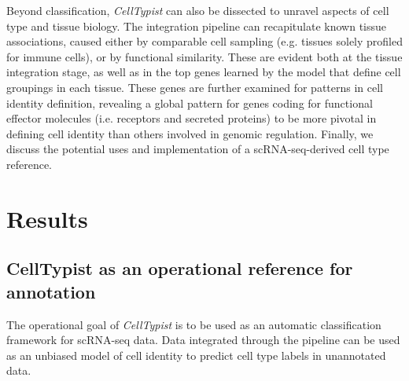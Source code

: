 Beyond classification, \textit{CellTypist} can also be dissected to unravel aspects of cell type and tissue biology. The integration pipeline can recapitulate known tissue associations, caused either by comparable cell sampling (e.g. tissues solely profiled for immune cells), or by functional similarity. These are evident both at the tissue integration stage, as well as in the top genes learned by the model that define cell groupings in each tissue. These genes are further examined for patterns in cell identity definition, revealing a global pattern for genes coding for functional effector molecules (i.e. receptors and secreted proteins) to be more pivotal in defining cell identity than others involved in genomic regulation. Finally, we discuss the potential uses and implementation of a scRNA-seq-derived cell type reference.


\section{Results}
\label{section4.2}
\subsection{CellTypist as an operational reference for annotation}
\label{section_test}
The operational goal of \textit{CellTypist} is to be used as an automatic classification framework for scRNA-seq data. Data integrated through the pipeline can be used as an unbiased model of cell identity to predict cell type labels in unannotated data.

